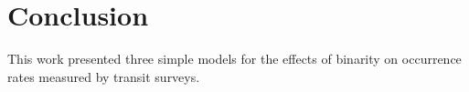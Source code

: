 \section{Conclusion}
\label{sec:conclusion}

This work presented three simple models for the effects of binarity on 
occurrence rates measured by transit surveys.